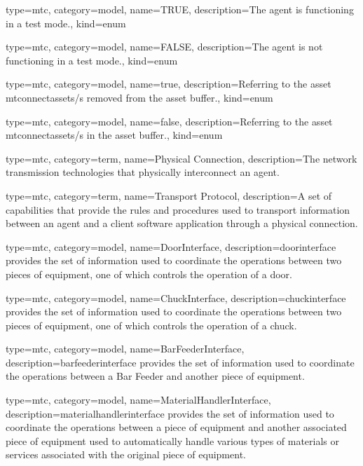 {
  type=mtc,
  category=model,
  name={TRUE},
  description={The \gls{agent} is functioning in a test mode.},
  kind={enum}
}

{
  type=mtc,
  category=model,
  name={FALSE},
  description={The \gls{agent} is not functioning in a test mode.},
  kind={enum}
}

{
  type=mtc,
  category=model,
  name={true},
  description={Referring to the \gls{asset mtconnectassets}/s removed from the \gls{asset buffer}.},
  kind={enum}
}

{
  type=mtc,
  category=model,
  name={false},
  description={Referring to the \gls{asset mtconnectassets}/s in the \gls{asset buffer}.},
  kind={enum}
}

{
  type=mtc,
  category=term,
  name={Physical Connection},
  description={The network transmission technologies that physically interconnect an \gls{agent}.}
}

{
  type=mtc,
  category=term,
  name={Transport Protocol},
  description={A set of capabilities that provide the rules and procedures used to transport information between an \gls{agent} and a client software application through a \gls{physical connection}.}
}

{
  type=mtc,
  category=model,
  name={DoorInterface},
  description={\gls{doorinterface} provides the set of information used to coordinate the operations between two pieces of equipment, one of which controls the operation of a door. }
}


{
  type=mtc,
  category=model,
  name={ChuckInterface},
  description={\gls{chuckinterface} provides the set of information used to coordinate the operations between two pieces of equipment, one of which controls the operation of a chuck.  }
}


{
  type=mtc,
  category=model,
  name={BarFeederInterface},
  description={\gls{barfeederinterface} provides the set of information used to coordinate the operations between a Bar Feeder and another piece of equipment.  }
}


{
  type=mtc,
  category=model,
  name={MaterialHandlerInterface},
  description={\gls{materialhandlerinterface} provides the set of information used to coordinate the operations between a piece of equipment and another associated piece of equipment used to automatically handle various types of materials or services associated with the original piece of equipment. }
}


